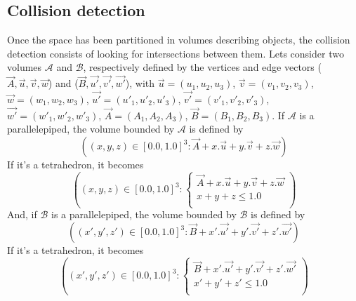 \documentclass[12pt, a4paper]{article}
\begin{document}
\subsection{Collision detection}

Once the space has been partitioned in volumes describing objects, the collision detection consists of looking for intersections between them. Lets consider two volumes $\mathcal{A}$ and $\mathcal{B}$, respectively defined by the vertices and edge vectors ($\overrightarrow{A}, \overrightarrow{u}, \overrightarrow{v}, \overrightarrow{w}$) and ($\overrightarrow{B}, \overrightarrow{u'}, \overrightarrow{v'}, \overrightarrow{w'}$), with $\overrightarrow{u}=(u_1, u_2, u_3)$, $\overrightarrow{v}=(v_1, v_2, v_3)$, $\overrightarrow{w}=(w_1, w_2, w_3)$, $\overrightarrow{u'}=(u'_1, u'_2, u'_3)$, $\overrightarrow{v'}=(v'_1, v'_2, v'_3)$, $\overrightarrow{w'}=(w'_1, w'_2, w'_3)$, $\overrightarrow{A}=(A_1, A_2, A_3)$, $\overrightarrow{B}=(B_1, B_2, B_3)$. If $\mathcal{A}$ is a parallelepiped, the volume bounded by $\mathcal{A}$ is defined by
\begin{equation}
\left((x, y, z)\in[0.0, 1.0]^3:\overrightarrow{A}+x.\overrightarrow{u}+y.\overrightarrow{v}+z.\overrightarrow{w}\right) 
\end{equation}
If it's a tetrahedron, it becomes
\begin{equation}
\left((x, y, z)\in[0.0, 1.0]^3:\left\{\begin{array}{l}
\overrightarrow{A}+x.\overrightarrow{u}+y.\overrightarrow{v}+z.\overrightarrow{w}\\
x+y+z\le 1.0\\
\end{array}\right.\right) 
\end{equation}
And, if $\mathcal{B}$ is a parallelepiped, the volume bounded by $\mathcal{B}$ is defined by
\begin{equation}
\left((x', y', z')\in[0.0, 1.0]^3:\overrightarrow{B}+x'.\overrightarrow{u'}+y'.\overrightarrow{v'}+z'.\overrightarrow{w'}\right)
\end{equation}
If it's a tetrahedron, it becomes
\begin{equation}
\left((x', y', z')\in[0.0, 1.0]^3:\left\{\begin{array}{l}
\overrightarrow{B}+x'.\overrightarrow{u'}+y'.\overrightarrow{v'}+z'.\overrightarrow{w'}\\
x'+y'+z'\le 1.0\\
\end{array}\right.\right) 
\end{equation}
\end{document}
